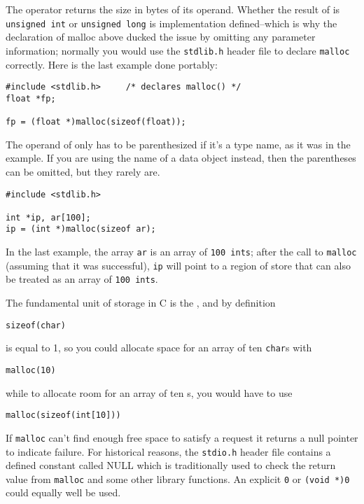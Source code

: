   

  The \sizeof{} operator returns the size in bytes of its
   operand. Whether the result of \sizeof{} is \texttt{unsigned
   int} or \texttt{unsigned long} is implementation
   defined--which is why the declaration of malloc above ducked the
   issue by omitting any parameter information; normally you would use the
   \texttt{stdlib.h} header file to declare \texttt{malloc}
   correctly. Here is the last example done portably:


  \begin{Verbatim}
#include <stdlib.h>     /* declares malloc() */
float *fp;

fp = (float *)malloc(sizeof(float));
\end{Verbatim}

  The operand of \sizeof{} only has to be parenthesized if it's
   a type name, as it was in the example. If you are using the name of
   a data object instead, then the parentheses can be omitted, but they
   rarely are.


  \begin{Verbatim}
#include <stdlib.h>

int *ip, ar[100];
ip = (int *)malloc(sizeof ar);
\end{Verbatim}

  In the last example, the array \texttt{ar} is an array of \texttt{100
   ints}; after the call to \texttt{malloc} (assuming that it was
   successful), \texttt{ip} will point to a region of store that can
   also be treated as an array of \texttt{100 ints}.


  The fundamental unit of storage in C is the \kchar, and by
   definition


  \begin{Verbatim}
sizeof(char)
\end{Verbatim}

  is equal to 1, so you could allocate space for an array of ten
   \texttt{char}s with


  \begin{Verbatim}
malloc(10)
\end{Verbatim}

  while to allocate room for an array of ten \kint{}s, you would
   have to use


  \begin{Verbatim}
malloc(sizeof(int[10]))
\end{Verbatim}

  If \texttt{malloc} can't find enough free space to satisfy
   a request it returns a null pointer to indicate failure. For historical
   reasons, the \texttt{stdio.h} header file contains a defined constant
   called NULL which is traditionally used to check the return value from
   \texttt{malloc} and some other library functions. An explicit
   \texttt{0} or \texttt{(void *)0} could equally well be used.


